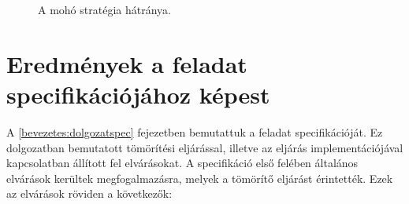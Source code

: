 \documentclass[oneside,titlepage,12pt,a4paper]{report}
\begin{document}
\begin{figure}[htb!]
\caption{A mohó stratégia hátránya.}
\label{fig:counterexample}
\end{figure}	

\section{Eredmények a feladat specifikációjához képest}

A \ref{bevezetes:dolgozatspec} fejezetben bemutattuk a feladat specifikációját. Ez dolgozatban bemutatott tömörítési eljárással, illetve az eljárás implementációjával kapcsolatban állított fel elvárásokat. A specifikáció első felében általános elvárások kerültek megfogalmazásra, melyek a tömörítő eljárást érintették. Ezek az elvárások röviden a következők: 
\end{document}
